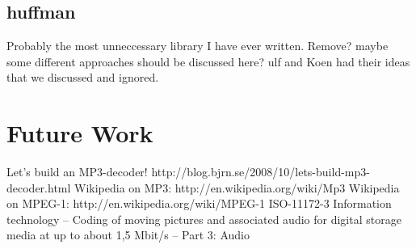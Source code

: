 \documentclass[a4paper,12pt]{article}
\begin{document}
    \subsection{huffman}
    \label{sec:huffman}
        Probably the most unneccessary library I have ever written. Remove?
        maybe some different approaches should be discussed here? ulf and Koen
        had their ideas that we discussed and ignored.

\section{Future Work}

\begin{thebibliography}{99}
        Let's build an MP3-decoder!
        http://blog.bjrn.se/2008/10/lets-build-mp3-decoder.html
        Wikipedia on MP3: http://en.wikipedia.org/wiki/Mp3
        Wikipedia on MPEG-1: http://en.wikipedia.org/wiki/MPEG-1
        ISO-11172-3 Information technology -- Coding of moving pictures and
        associated audio for digital storage media at up to about 1,5 Mbit/s --
        Part 3: Audio
\end{thebibliography}
\end{document}
